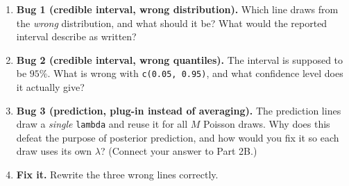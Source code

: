 \documentclass{article}
\begin{document}
\begin{enumerate}[label={\bfseries (\Alph*)},itemsep=.6em]
    \item \textbf{Bug 1 (credible interval, wrong distribution).} Which line draws from the \emph{wrong} distribution, and what should it be? What would the reported interval describe as written? \\[3.5em]

    \item \textbf{Bug 2 (credible interval, wrong quantiles).} The interval is supposed to be $95\%$. What is wrong with \texttt{c(0.05, 0.95)}, and what confidence level does it actually give? \\[3em]

    \item \textbf{Bug 3 (prediction, plug-in instead of averaging).} The prediction lines draw a \emph{single} \texttt{lambda} and reuse it for all $M$ Poisson draws. Why does this defeat the purpose of posterior prediction, and how would you fix it so each draw uses its own $\lambda$? (Connect your answer to Part 2B.) \\[4em]

    \item \textbf{Fix it.} Rewrite the three wrong lines correctly. \\[5em]
\end{enumerate}
\end{document}
